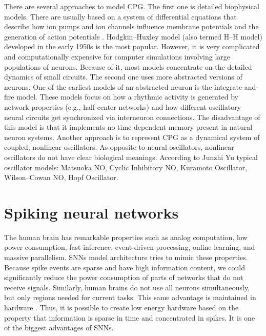 There are several approaches to model CPG. The first one is detailed biophysical models. There are usually based on a system of differential equations that describe how ion pumps and ion channels influence membrane potentials and the generation of action potentials \cite{ref2} \cite{ref3} \cite{ref4}. Hodgkin–Huxley model \cite{ref1_2}(also termed H–H model) developed in the early 1950s is the most popular. However, it is very complicated and computationally expensive for computer simulations involving large populations of neurons. Because of it, most models concentrate on the detailed dynamics of small circuits. The second one uses more abstracted versions of neurons. One of the earliest models of an abstracted neuron is the integrate-and-fire model\cite{ref5}\cite{ref6}. These models focus on how a rhythmic activity is generated by network properties (e.g., half-center networks) and how different oscillatory neural circuits get synchronized via interneuron connections. The disadvantage of this model is that it implements no time-dependent memory present in natural neuron systems. Another approach is to represent CPG as a dynamical system of coupled, nonlinear oscillators. As opposite to neural oscillators, nonlinear oscillators do not have clear biological meanings. According to Junzhi Yu\cite{ref7} typical oscillator models: Matsuoka NO, Cyclic Inhibitory NO, Kuramoto Oscillator, Wilson–Cowan NO, Hopf Oscillator. \cite{ref8} \cite{ref9}

\section{Spiking neural networks}
The human brain has remarkable properties such as analog computation, low power consumption, fast inference, event-driven processing, online learning, and massive parallelism. SNNs model architecture tries to mimic these properties. Because spike events are sparse and have high information content, we could significantly reduce the power consumption of parts of networks that do not receive signals. \cite{ref13}  Similarly, human brains do not use all neurons simultaneously, but only regions needed for current tasks. This same advantage is maintained in hardware \cite{ref14} \cite{ref15}. Thus, it is possible to create low energy hardware based on the property that information is sparse in time and concentrated in spikes. It is one of the biggest advantages of SNNs.

